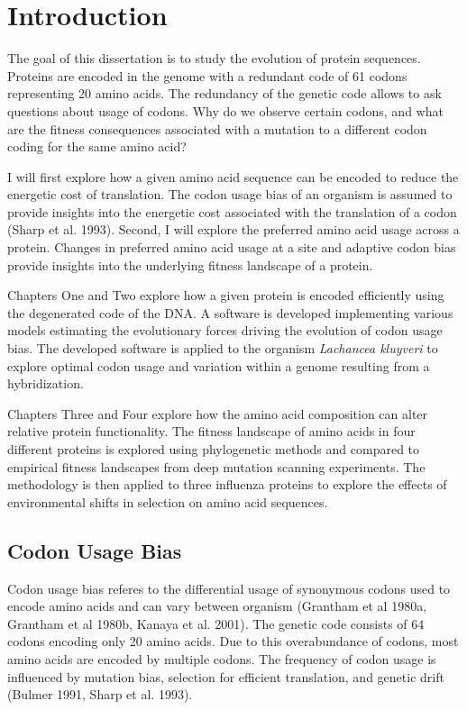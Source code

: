 \chapter{Introduction} 
\label{ch:introduction}

The goal of this dissertation is to study the evolution of protein sequences.
Proteins are encoded in the genome with a redundant code of 61 codons representing 20 amino acids.
The redundancy of the genetic code allows to ask questions about usage of codons.
Why do we observe certain codons, and what are the fitness consequences associated with a mutation to a different codon coding for the same amino acid?

I will first explore how a given amino acid sequence can be encoded to reduce the energetic cost of translation.
The codon usage bias of an organism is assumed to provide insights into the energetic cost associated with the translation of a codon (Sharp et al. 1993).
Second, I will explore the preferred amino acid usage across a protein.
Changes in preferred amino acid usage at a site and adaptive codon bias provide insights into the underlying fitness landscape of a protein.

Chapters One and Two explore how a given protein is encoded efficiently using the degenerated code of the DNA.
A software is developed implementing various models estimating the evolutionary forces driving the evolution of codon usage bias.
The developed software is applied to the organism \textit{Lachancea kluyveri} to explore optimal codon usage and variation within a genome resulting from a hybridization.

Chapters Three and Four explore how the amino acid composition can alter relative protein functionality.
The fitness landscape of amino acids in four different proteins is explored using phylogenetic methods and compared to empirical fitness landscapes from deep mutation scanning experiments.
The methodology is then applied to three influenza proteins to explore the effects of environmental shifts in selection on amino acid sequences. 

\section{Codon Usage Bias}
Codon usage bias referes to the differential usage of synonymous codons used to encode amino acids and can vary between organism (Grantham et al 1980a, Grantham et al 1980b, Kanaya et al. 2001). 
The genetic code consists of 64 codons encoding only 20 amino acids. 
Due to this overabundance of codons, most amino acids are encoded by multiple codons. 
The frequency of codon usage is influenced by mutation bias, selection for efficient translation, and genetic drift (Bulmer 1991, Sharp et al. 1993).

